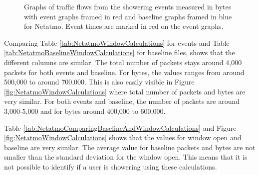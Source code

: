 \begin{figure}[H]
\begin{subfigure}[b]{0.47\textwidth}
        \centering
    \end{subfigure}
        \begin{subfigure}[b]{0.47\textwidth}
        \centering
    \end{subfigure}
    \begin{subfigure}[b]{0.47\textwidth}
        \centering
    \end{subfigure}
    \begin{subfigure}[b]{0.47\textwidth}
        \centering
    \end{subfigure}
    \hspace{0.6cm}
    \begin{subfigure}[b]{0.47\textwidth}
    \centering
        \end{subfigure}
    \caption{Graphs of traffic flows from the showering events measured in bytes with event graphs framed in red and baseline graphs framed in blue for Netatmo. Event times are marked in red on the event graphs.}  
    \label{fig:NetatmoWindowBytes2}
\end{figure}

Comparing Table \ref{tab:NetatmoWindowCalculations} for events and Table \ref{tab:NetatmoBaselineWindowCalculations} for baseline files, shows that the different columns are similar. The total number of packets stays around 4,000 packets for both events and baseline. For bytes, the values ranges from around 500,000 to around 700,000. This is also easily visible in Figure \ref{fig:NetatmoWindowCalculations} where total number of packets and bytes are very similar. For both events and baseline, the number of packets are around 3,000-5,000 and for bytes around 400,000 to 600,000. 

Table \ref{tab:NetatmoComparingBaselineAndWindowCalculations} and Figure \ref{fig:NetatmoWindowCalculations} shows that the values for window open and baseline are very similar. The average value for baseline packets and bytes are not smaller than the standard deviation for the window open. This means that it is not possible to identify if a user is showering using these calculations. 

